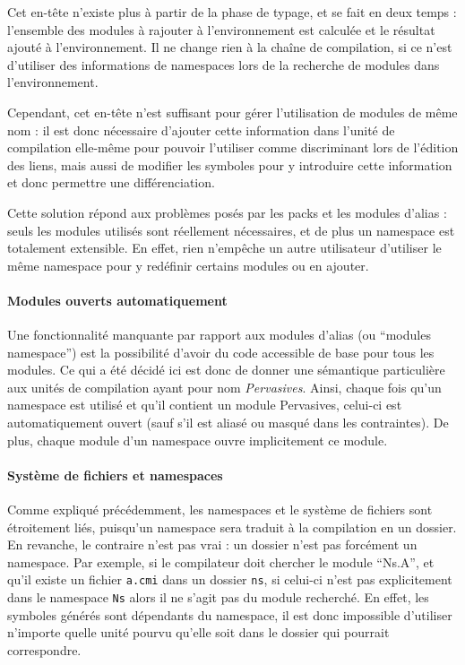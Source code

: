 \documentclass[11pt,a4paper]{report}
\begin{document}
Cet en-tête n'existe plus à partir de la phase de typage, et se fait en deux
temps : l'ensemble des modules à rajouter à l'environnement est calculée et le
résultat ajouté à l'environnement. Il ne change rien à la chaîne de compilation,
si ce n'est d'utiliser des informations de namespaces lors de la recherche de
modules dans l'environnement.

Cependant, cet en-tête n'est suffisant pour gérer l'utilisation de modules de
même nom : il est donc nécessaire d'ajouter cette information dans l'unité de
compilation elle-même pour pouvoir l'utiliser comme discriminant lors de
l'édition des liens, mais aussi de modifier les symboles pour y introduire cette
information et donc permettre une différenciation.

Cette solution répond aux problèmes posés par les packs et les modules d'alias :
seuls les modules utilisés sont réellement nécessaires, et de plus un namespace
est totalement extensible. En effet, rien n'empêche un autre utilisateur
d'utiliser le même namespace pour y redéfinir certains modules ou en ajouter.

\paragraph{Modules ouverts automatiquement}

Une fonctionnalité manquante par rapport aux modules d'alias (ou ``modules
namespace'') est la possibilité d'avoir du code accessible de base pour tous les
modules. Ce qui a été décidé ici est donc de donner une sémantique particulière
aux unités de compilation ayant pour nom \emph{Pervasives}. Ainsi, chaque fois
qu'un namespace est utilisé et qu'il contient un module Pervasives, celui-ci est
automatiquement ouvert (sauf s'il est aliasé ou masqué dans les contraintes). De
plus, chaque module d'un namespace ouvre implicitement ce module.

\paragraph{Système de fichiers et namespaces}

Comme expliqué précédemment, les namespaces et le système de fichiers sont
étroitement liés, puisqu'un namespace sera traduit à la compilation en un
dossier. En revanche, le contraire n'est pas vrai : un dossier n'est pas
forcément un namespace. Par exemple, si le compilateur doit chercher le module
``Ns.A'', et qu'il existe un fichier \texttt{a.cmi} dans un dossier \texttt{ns},
si celui-ci n'est pas explicitement dans le namespace \texttt{Ns} alors il ne
s'agit pas du module recherché. En effet, les symboles générés sont dépendants
du namespace, il est donc impossible d'utiliser n'importe quelle unité pourvu
qu'elle soit dans le dossier qui pourrait correspondre. 
\end{document}
